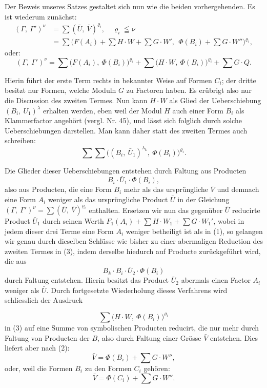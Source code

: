 \documentclass[11pt]{article}
\providecommand{\weberpage}[1]{}
\providecommand{\weq}[2]{\begin{equation}\tag{#1}#2\end{equation}}
\let\Gamma\varGamma
\let\Phi\varPhi
\begin{document}
Der Beweis unseres Satzes gestaltet sich nun wie die beiden
vorhergehenden. Es ist wiederum zunächst:
\[
\begin{aligned}
(\Gamma,\ \Gamma')^\nu &= \sum (\bar U,\ \bar V)^{\varrho_i}, \quad \varrho_i \leqq \nu\\
&= \sum \bigl(F(A_i) + \sum H\cdot W + \sum G\cdot W',\ \ \Phi(B_i) + \sum G\cdot W''\bigr)^{\varrho_i},
\end{aligned}
\]
oder:
\weq{3}{(\Gamma,\ \Gamma')^\nu = \sum \bigl(F(A_i),\ \Phi(B_i)\bigr)^{\varrho_i} + \sum \bigl(H\cdot W,\ \Phi(B_i)\bigr)^{\varrho_i} + \sum G\cdot Q.}

Hierin führt der erste Term rechts in bekannter Weise auf Formen $C_i$;
der dritte besitzt nur Formen, welche Moduln $G$ zu Factoren haben. Es
erübrigt also nur die Discussion des zweiten Termes. Nun kann $H\cdot W$
als Glied der Ueberschiebung $(B_i,\ U_1)^\lambda$ erhalten werden, eben
weil der Modul $H$ auch einer Form $B_i$ als Klammerfactor angehört
(vergl. Nr. 45), und lässt sich folglich durch solche Ueberschiebungen
darstellen. Man kann daher statt des zweiten Termes auch schreiben:
\[ \sum \sum \bigl((B_i,\ \bar U_1)^{\lambda_k},\ \Phi(B_i)\bigr)^{\varrho_i}. \]

Die Glieder dieser Ueberschiebungen entstehen durch Faltung aus Producten
\[ B_i \cdot \bar U_1 \cdot \Phi(B_i), \]
also aus Producten, die eine Form $B_i$ mehr als das ursprüngliche $\bar
V$ und demnach eine Form $A_i$ weniger als das ursprüngliche Product
$\bar U$ in der Gleichung $(\Gamma,\ \Gamma')^\nu = \sum (\bar U,\ \bar
V)^{\varrho_i}$ enthalten. Ersetzen wir nun das gegenüber $\bar U$
reducirte Product $\bar U_1$ durch seinen Werth $F_1(A_i) + \sum H\cdot
W_1 + \sum G\cdot W_1'$, wobei in jedem dieser drei Terme eine Form $A_i$
weniger betheiligt ist als in (1), so gelangen wir genau durch dieselben
Schlüsse wie bisher zu einer abermaligen Reduction des zweiten Termes in
(3), indem derselbe hiedurch auf Producte zurückgeführt wird, die aus
\[ B_k \cdot B_i \cdot \bar U_2 \cdot \Phi(B_i) \]
durch Faltung entstehen. Hierin besitzt das Product $\bar U_2$ abermals
einen Factor $A_i$ weniger als $\bar U$. Durch fortgesetzte Wiederholung
dieses Verfahrens wird schliesslich der Ausdruck


\weberpage{231}
\[ \sum \bigl(H\cdot W,\ \Phi(B_i)\bigr)^{\varrho_i} \]
in (3) auf eine Summe von symbolischen Producten reducirt, die nur mehr
durch Faltung von Producten der $B$, also durch Faltung einer Grösse
$\bar V$ entstehen. Dies liefert aber nach (2):
\[ \bar V = \Phi(B_i) + \sum G\cdot W'', \]
oder, weil die Formen $B_i$ zu den Formen $C_i$ gehören:
\[ \bar V = \Phi(C_i) + \sum G\cdot W''. \]
\end{document}
